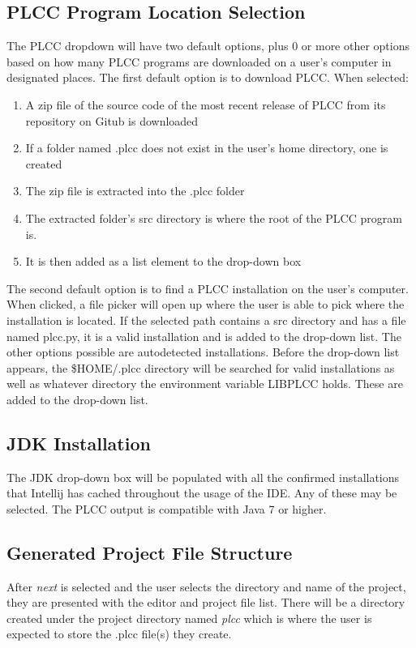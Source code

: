\documentclass[conference, letterpaper]{IEEEtran}
\begin{document}
\subsection{PLCC Program Location Selection}\label{subsec:plcc-program-location}
The PLCC dropdown will have two default options, plus 0 or more other options based on how many PLCC programs are downloaded on a user's computer in designated places.
The first default option is to download PLCC\@.
When selected:
\begin{enumerate}
    \item A zip file of the source code of the most recent release of PLCC from its repository on Gitub is downloaded
    \item If a folder named .plcc does not exist in the user's home directory, one is created
    \item The zip file is extracted into the .plcc folder
    \item The extracted folder's src directory is where the root of the PLCC program is.
    \item It is then added as a list element to the drop-down box
\end{enumerate}
The second default option is to find a PLCC installation on the user's computer.
When clicked, a file picker will open up where the user is able to pick where the installation is located.
If the selected path contains a src directory and has a file named plcc.py, it is a valid installation and is added to the drop-down list.
The other options possible are autodetected installations.
Before the drop-down list appears, the \$HOME/.plcc directory will be searched for valid installations as well as whatever directory the environment variable LIBPLCC holds.
These are added to the drop-down list.

\subsection{JDK Installation}\label{subsec:jdk-installation}
The JDK drop-down box will be populated with all the confirmed installations that Intellij has cached throughout the usage of the IDE. Any of these may be selected.
The PLCC output is compatible with Java 7 or higher.

\subsection{Generated Project File Structure}\label{subsec:generated-project-file-structure}
After \textit{next} is selected and the user selects the directory and name of the project, they are presented with the editor and project file list.
There will be a directory created under the project directory named \textit{plcc} which is where the user is expected to store the .plcc file(s) they create.
\end{document}
